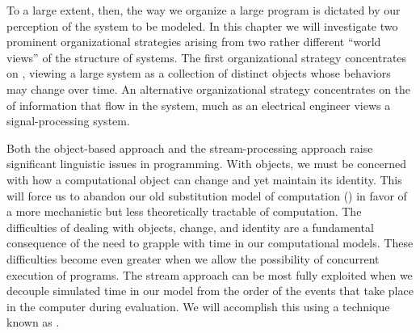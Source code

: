 To a large extent, then, the way we organize a large program is dictated by our
perception of the system to be modeled.  In this chapter we will investigate
two prominent organizational strategies arising from two rather different
``world views'' of the structure of systems.  The first organizational strategy
concentrates on , viewing a large system as a collection of
distinct objects whose behaviors may change over time.  An alternative
organizational strategy concentrates on the  of information
that flow in the system, much as an electrical engineer views a
signal-processing system.

Both the object-based approach and the stream-processing approach raise
significant linguistic issues in programming.  With objects, we must be
concerned with how a computational object can change and yet maintain its
identity.  This will force us to abandon our old substitution model of
computation () in favor of a more mechanistic but less
theoretically tractable  of computation.  The
difficulties of dealing with objects, change, and identity are a fundamental
consequence of the need to grapple with time in our computational models.
These difficulties become even greater when we allow the possibility of
concurrent execution of programs.  The stream approach can be most fully
exploited when we decouple simulated time in our model from the order of the
events that take place in the computer during evaluation.  We will accomplish
this using a technique known as .







